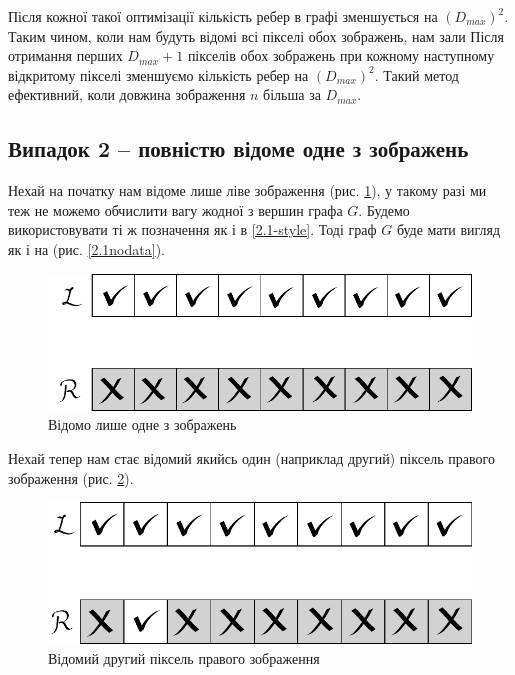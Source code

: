 \documentclass{ConfFTI}
\begin{document}
Після кожної такої оптимізації кількість ребер в графі зменшується на $(D_{max})^2$. Таким чином, коли нам будуть відомі всі пікселі обох зображень, нам зали
Після отримання перших $D_{max} + 1$ пікселів обох зображень при кожному наступному відкритому пікселі зменшуємо кількість ребер на $(D_{max})^2$. Такий метод ефективний, коли довжина зображення $n$ більша за $D_{max}$.	
 

\subsection{Випадок 2 -- повністю відоме одне з зображень} \label{2.2}
Нехай на початку нам відоме лише ліве зображення (рис. \ref{2.2oneimage}), у такому разі ми теж не можемо обчислити вагу жодної з вершин графа $G$. Будемо використовувати ті ж позначення як і в  \ref{2.1-style}. Тоді граф $G$ буде мати вигляд як і на (рис. \ref{2.1nodata}).
\begin{figure}[h!]
	\centering
	\includegraphics[scale = 0.5]{allclosed.pdf}
	\caption{Відомо лише одне з зображень}
	\label{2.2oneimage}
\end{figure}
\newpage

Нехай тепер нам стає відомий якийсь  один (наприклад другий) піксель правого зображення (рис. \ref{2.2oneRpixel}). 
\begin{figure}[h!]
	\centering
	\includegraphics[scale = 0.5]{pixelknown.pdf}
	\caption{Відомий другий піксель правого зображення}
	\label{2.2oneRpixel}
\end{figure}
	
\end{document}
